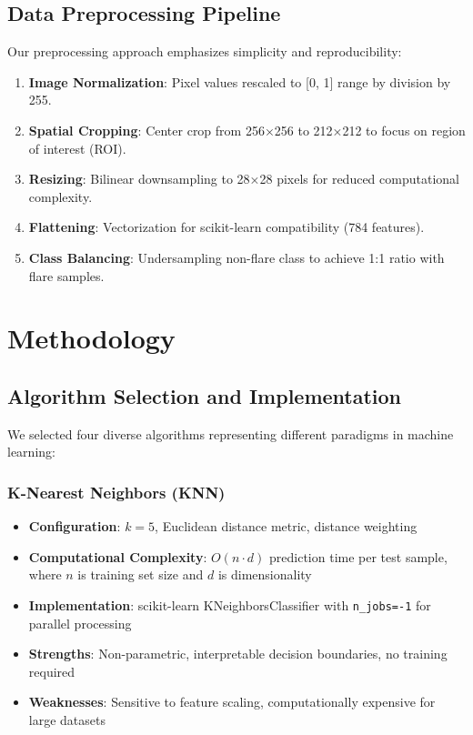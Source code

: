 \documentclass[11pt,a4paper]{article}
\begin{document}
\subsection{Data Preprocessing Pipeline}

Our preprocessing approach emphasizes simplicity and reproducibility:

\begin{enumerate}
    \item \textbf{Image Normalization}: Pixel values rescaled to [0, 1] range by division by 255.
    \item \textbf{Spatial Cropping}: Center crop from 256×256 to 212×212 to focus on region of interest (ROI).
    \item \textbf{Resizing}: Bilinear downsampling to 28×28 pixels for reduced computational complexity.
    \item \textbf{Flattening}: Vectorization for scikit-learn compatibility (784 features).
    \item \textbf{Class Balancing}: Undersampling non-flare class to achieve 1:1 ratio with flare samples.
\end{enumerate}

\section{Methodology}

\subsection{Algorithm Selection and Implementation}

We selected four diverse algorithms representing different paradigms in machine learning:

\subsubsection{K-Nearest Neighbors (KNN)}

\begin{itemize}
    \item \textbf{Configuration}: $k=5$, Euclidean distance metric, distance weighting
    \item \textbf{Computational Complexity}: \(O(n \cdot d)\) prediction time per test sample, where \(n\) is training set size and \(d\) is dimensionality
    \item \textbf{Implementation}: scikit-learn KNeighborsClassifier with \texttt{n\_jobs=-1} for parallel processing
    \item \textbf{Strengths}: Non-parametric, interpretable decision boundaries, no training required
    \item \textbf{Weaknesses}: Sensitive to feature scaling, computationally expensive for large datasets
\end{itemize}
\end{document}

